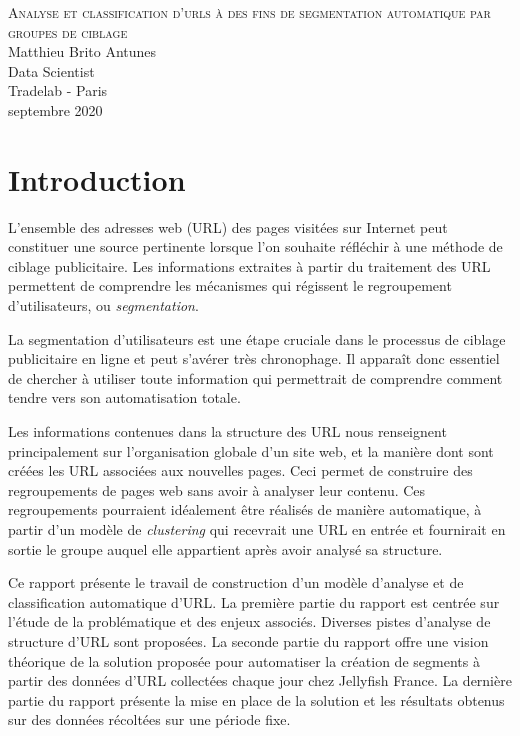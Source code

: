\documentclass[11pt, a4paper]{article}
\begin{document}
	
\begin{titlepage}
\centering
\LARGE{\textsc{Analyse et classification d'urls à des fins de segmentation automatique par groupes de ciblage}}\\
\vfill
\large Matthieu Brito Antunes\\
\large Data Scientist\\
\large Tradelab - Paris\\
\large septembre 2020\\
\end{titlepage}

\newpage
\tableofcontents
\listoftables
\listoffigures
\thispagestyle{empty}

\newpage
{}

\section{Introduction}
\label{sec:intro}

L'ensemble des adresses web (URL) des pages visitées sur Internet peut constituer une source pertinente lorsque l'on souhaite réfléchir à une méthode de ciblage publicitaire. Les informations extraites à partir du traitement des URL permettent de comprendre les mécanismes qui régissent le regroupement d'utilisateurs, ou \textit{segmentation}. 

La segmentation d'utilisateurs est une étape cruciale dans le processus de ciblage publicitaire en ligne et peut s'avérer très chronophage. Il apparaît donc essentiel de chercher à utiliser toute information qui permettrait de comprendre comment tendre vers son automatisation totale.

Les informations contenues dans la structure des URL nous renseignent principalement sur l'organisation globale d'un site web, et la manière dont sont créées les URL associées aux nouvelles pages. Ceci permet de construire des regroupements de pages web sans avoir à analyser leur contenu. Ces regroupements pourraient idéalement être réalisés de manière automatique, à partir d'un modèle de \textit{clustering} qui recevrait une URL en entrée et fournirait en sortie le groupe auquel elle appartient après avoir analysé sa structure.

Ce rapport présente le travail de construction d'un modèle d'analyse et de classification automatique d'URL. La première partie du rapport est centrée sur l'étude de la problématique et des enjeux associés. Diverses pistes d'analyse de structure d'URL sont proposées. La seconde partie du rapport offre une vision théorique de la solution proposée pour automatiser la création de segments à partir des données d'URL collectées chaque jour chez Jellyfish France. La dernière partie du rapport présente la mise en place de la solution et les résultats obtenus sur des données récoltées sur une période fixe.
\end{document}
